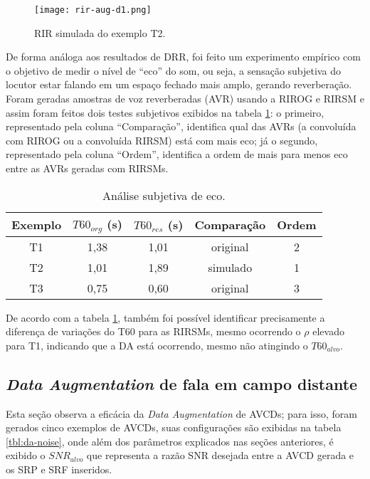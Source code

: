 \begin{figure} [H]
    \centering
    \texttt{[image: rir-aug-d1.png]}
    \caption{RIR simulada do exemplo T2.}
    \label{fig:rir-aug-t2}
\end{figure} 

De forma análoga aos resultados de DRR, foi feito um experimento empírico com o objetivo de medir o nível de “eco” do som, ou seja,
a sensação subjetiva do locutor estar falando em um espaço fechado mais amplo, gerando reverberação.
Foram geradas amostras de voz reverberadas (AVR) usando a RIROG e RIRSM e assim foram feitos dois testes subjetivos exibidos na tabela \ref{tbl:t60-exp}:
o primeiro, representado pela coluna “Comparação”, identifica qual das AVRs (a convoluída com RIROG ou a convoluída RIRSM) está com mais eco;
já o segundo, representado pela coluna “Ordem”, identifica a ordem de mais para menos eco entre as AVRs geradas com RIRSMs.

\begin{table} [H]
    \centering
    \caption{Análise subjetiva de eco.}
    \label{tbl:t60-exp}
    \begin{tabular}{c|c|c|c|c}

        \textbf{Exemplo} & 
        \textbf{$T60_{org}$ (s)} & 
        \textbf{$T60_{res}$ (s)} & 
        \textbf{Comparação} &
        \textbf{Ordem} \\
        \hline 

        T1 & 1,38 & 1,01 & original & 2 \\
        T2 & 1,01 & 1,89 & simulado & 1 \\
        T3 & 0,75 & 0,60 & original & 3 \\

    \end{tabular}
\end{table}

De acordo com a tabela \ref{tbl:t60-exp}, também foi possível identificar precisamente a diferença de variações do T60 para as RIRSMs,
mesmo ocorrendo o $\rho$ elevado para T1, indicando que a DA está ocorrendo, mesmo não atingindo o $T60_{alvo}$.


\subsection{\textit{Data Augmentation} de fala em campo distante}

Esta seção observa a eficácia da \textit{Data Augmentation} de AVCDs; para isso, foram gerados cinco exemplos de AVCDs, suas configurações
são exibidas na tabela \ref{tbl:da-noise}, onde além dos parâmetros explicados nas seções anteriores, é exibido o $SNR_{alvo}$ que representa
a razão SNR desejada entre a AVCD gerada e os SRP e SRF inseridos.

